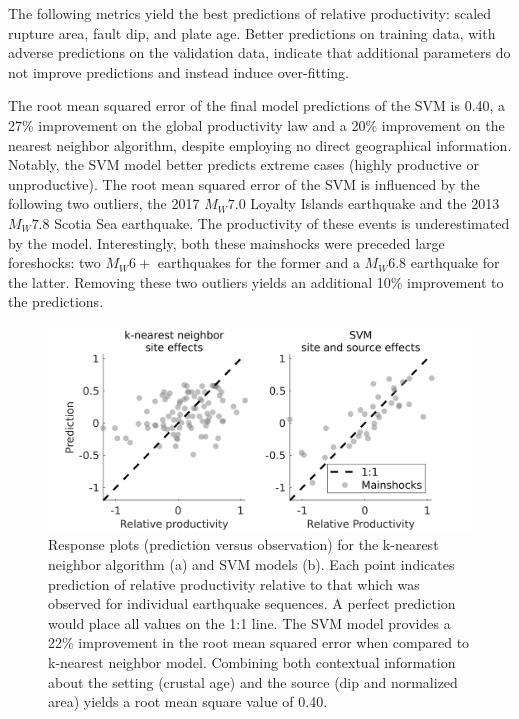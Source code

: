 \documentclass[draft, jgrga]{agujournal2018}
\begin{document}
    The following metrics yield the best predictions of relative productivity: scaled rupture area, fault dip, and plate age. Better predictions on training data, with adverse predictions on the validation data, indicate that additional parameters do not improve predictions and instead induce over-fitting.

    The root mean squared error of the final model predictions of the SVM is 0.40, a 27\% improvement on the global productivity law and a 20\% improvement on the nearest neighbor algorithm, despite employing no direct geographical information. Notably, the SVM model better predicts extreme cases (highly productive or unproductive). The root mean squared error of the SVM is influenced by the following two outliers, the 2017 $M_W7.0$ Loyalty Islands earthquake and the 2013 $M_W7.8$ Scotia Sea earthquake. The productivity of these events is underestimated by the model. Interestingly, both these mainshocks were preceded large foreshocks: two $M_W6+$ earthquakes for the former and a $M_W6.8$ earthquake for the latter. Removing these two outliers yields an additional 10\% improvement to the predictions.

    \begin{figure}
        \centering
        \includegraphics{response.png}
        \caption{Response plots (prediction versus observation) for the k-nearest neighbor algorithm (a) and SVM models (b). Each point indicates prediction of relative productivity relative to that which was observed for individual earthquake sequences. A perfect prediction would place all values on the 1:1 line. The SVM model provides a 22\% improvement in the root mean squared error when compared to k-nearest neighbor model. Combining both contextual information about the setting (crustal age) and the source (dip and normalized area) yields a root mean square value of 0.40.}
        \label{fig:response}
    \end{figure}
\end{document}
